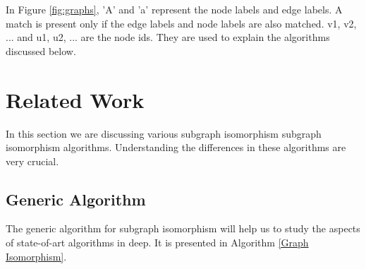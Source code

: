 \hspace{10mm} In Figure \ref{fig:graphs}, 'A' and 'a' represent the node labels and edge labels. A match is present only if the edge labels and node labels are also matched. v1, v2, ... and u1, u2, ... are the node ids. They are used to explain the algorithms discussed below.
\section{Related Work}
\label{sec:rw}
\hspace{10mm}In this section we are discussing various subgraph isomorphism subgraph isomorphism algorithms. Understanding the differences in these algorithms are very crucial.
\subsection{Generic Algorithm}
\label{sec:ga}
	\hspace{10mm}The generic algorithm\cite{GEN} for subgraph isomorphism will help us to study the aspects of state-of-art algorithms in deep. It is presented in Algorithm  \ref{Graph Isomorphism}.\\
